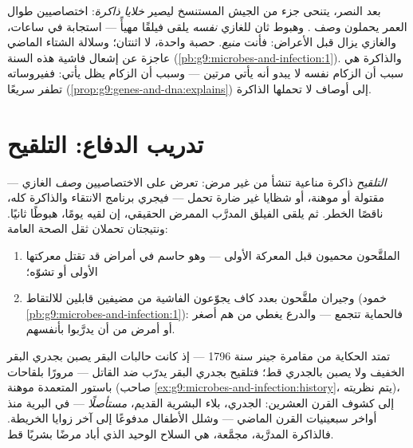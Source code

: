 \begin{definition}\label{def:g9:immune-defenses:memory}
بعد النصر، يتنحى جزء من الجيش المستنسخ ليصير \emph{خلايا
ذاكرة}: اختصاصيين طوال العمر يحملون
وصف . وهبوط ثان للغازي \emph{نفسه} يلقى فيلقًا
مهيأً --- استجابة في ساعات، والغازي يزال قبل الأعراض:
فأنت \emph{منيع}. حصبة واحدة، لا اثنتان؛
وسلالة الشتاء الماضي عاجزة عن إشعال فاشية هذه السنة
(\cref{pb:g9:microbes-and-infection:1}). والذاكرة هي سبب
أن الزكام نفسه لا يبدو أنه يأتي مرتين --- وسبب أن الزكام
يظل يأتي: ففيروساته تطفر سريعًا
(\cref{prop:g9:genes-and-dna:explains}) إلى أوصاف لا
تحملها الذاكرة.
\end{definition}

\section{تدريب الدفاع: التلقيح}

\begin{proposition}[التلقيح]\label{prop:g9:immune-defenses:vaccination}
\emph{التلقيح} ذاكرة مناعية تنشأ من غير
مرض: تعرض على الاختصاصيين \emph{وصف} الغازي ---
 مقتولة أو موهنة، أو شظايا غير ضارة تحمل
 --- فيجري برنامج الانتقاء والذاكرة كله، ناقصًا
الخطر. ثم يلقى الفيلق المدرَّب الممرض الحقيقي، إن لقيه
يومًا، هبوطًا ثانيًا. ونتيجتان تحملان ثقل الصحة العامة:
\begin{enumerate}
  \item الملقَّحون محميون قبل المعركة الأولى --- وهو
        حاسم في أمراض قد تقتل معركتها الأولى أو تشوّه؛
  \item وجيران ملقَّحون بعدد كاف يجوّعون الفاشية من
        مضيفين قابلين للالتقاط (خمود
        \cref{pb:g9:microbes-and-infection:1}): فالحماية
        تتجمع --- والدرع يغطي من هم أصغر أو أمرض من أن
        يدرَّبوا بأنفسهم.
\end{enumerate}
\end{proposition}
\admitted

\begin{example}\label{ex:g9:immune-defenses:history}
تمتد الحكاية من مقامرة جينر سنة 1796 --- إذ كانت حالبات
البقر يصبن بجدري البقر الخفيف ولا يصبن بالجدري قط؛
فتلقيح بجدري البقر يدرّب ضد القاتل --- مرورًا بلقاحات
باستور المتعمدة  موهنة (صاحب
\cref{ex:g9:microbes-and-infection:history}، يتم
نظريته)، إلى كشوف القرن العشرين: الجدري، بلاء البشرية
القديم، \emph{مستأصلًا} ---   في البرية منذ
أواخر سبعينيات القرن الماضي --- وشلل الأطفال مدفوعًا إلى
آخر زوايا الخريطة. فالذاكرة المدرَّبة، مجمَّعة، هي
السلاح الوحيد الذي أباد مرضًا بشريًا قط.
\end{example}

